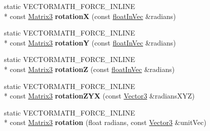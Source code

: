 \begin{DoxyCompactItemize}
\item 
\hypertarget{class_vectormath_1_1_aos_1_1_matrix3_a467944d1fe5cc189a008a1069f16854e}{static V\+E\+C\+T\+O\+R\+M\+A\+T\+H\+\_\+\+F\+O\+R\+C\+E\+\_\+\+I\+N\+L\+I\+N\+E \\*
const \hyperlink{class_vectormath_1_1_aos_1_1_matrix3}{Matrix3} {\bfseries rotation\+X} (const \hyperlink{class_vectormath_1_1float_in_vec}{float\+In\+Vec} \&radians)}\label{class_vectormath_1_1_aos_1_1_matrix3_a467944d1fe5cc189a008a1069f16854e}

\item 
\hypertarget{class_vectormath_1_1_aos_1_1_matrix3_a706f057e0f5b216143b16f2772ce89a7}{static V\+E\+C\+T\+O\+R\+M\+A\+T\+H\+\_\+\+F\+O\+R\+C\+E\+\_\+\+I\+N\+L\+I\+N\+E \\*
const \hyperlink{class_vectormath_1_1_aos_1_1_matrix3}{Matrix3} {\bfseries rotation\+Y} (const \hyperlink{class_vectormath_1_1float_in_vec}{float\+In\+Vec} \&radians)}\label{class_vectormath_1_1_aos_1_1_matrix3_a706f057e0f5b216143b16f2772ce89a7}

\item 
\hypertarget{class_vectormath_1_1_aos_1_1_matrix3_a3a75ad2c225b491cbf238980c4575583}{static V\+E\+C\+T\+O\+R\+M\+A\+T\+H\+\_\+\+F\+O\+R\+C\+E\+\_\+\+I\+N\+L\+I\+N\+E \\*
const \hyperlink{class_vectormath_1_1_aos_1_1_matrix3}{Matrix3} {\bfseries rotation\+Z} (const \hyperlink{class_vectormath_1_1float_in_vec}{float\+In\+Vec} \&radians)}\label{class_vectormath_1_1_aos_1_1_matrix3_a3a75ad2c225b491cbf238980c4575583}

\item 
\hypertarget{class_vectormath_1_1_aos_1_1_matrix3_a52ce43d108608ab358db15b80020af20}{static V\+E\+C\+T\+O\+R\+M\+A\+T\+H\+\_\+\+F\+O\+R\+C\+E\+\_\+\+I\+N\+L\+I\+N\+E \\*
const \hyperlink{class_vectormath_1_1_aos_1_1_matrix3}{Matrix3} {\bfseries rotation\+Z\+Y\+X} (const \hyperlink{class_vectormath_1_1_aos_1_1_vector3}{Vector3} \&radians\+X\+Y\+Z)}\label{class_vectormath_1_1_aos_1_1_matrix3_a52ce43d108608ab358db15b80020af20}

\item 
\hypertarget{class_vectormath_1_1_aos_1_1_matrix3_a0a03cea9ec13b69af30adb7aed9550a8}{static V\+E\+C\+T\+O\+R\+M\+A\+T\+H\+\_\+\+F\+O\+R\+C\+E\+\_\+\+I\+N\+L\+I\+N\+E \\*
const \hyperlink{class_vectormath_1_1_aos_1_1_matrix3}{Matrix3} {\bfseries rotation} (float radians, const \hyperlink{class_vectormath_1_1_aos_1_1_vector3}{Vector3} \&unit\+Vec)}\label{class_vectormath_1_1_aos_1_1_matrix3_a0a03cea9ec13b69af30adb7aed9550a8}


\end{DoxyCompactItemize}
